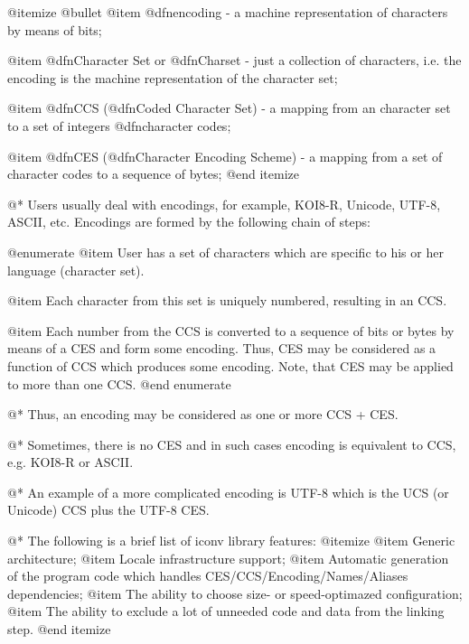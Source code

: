 @itemize @bullet
@item
@dfn{encoding} - a machine representation of characters by means of bits;

@item
@dfn{Character Set} or @dfn{Charset} - just a collection of
characters, i.e. the encoding is the machine representation of the character set; 

@item
@dfn{CCS} (@dfn{Coded Character Set}) - a mapping from an character set to a
set of integers @dfn{character codes};

@item
@dfn{CES} (@dfn{Character Encoding Scheme}) - a mapping from a set of character
codes to a sequence of bytes;
@end itemize

@*
Users usually deal with encodings, for example, KOI8-R, Unicode, UTF-8,
ASCII, etc. Encodings are formed by the following chain of steps:

@enumerate
@item
User has a set of characters which are specific to his or her language (character set).

@item
Each character from this set is uniquely numbered, resulting in an CCS.

@item
Each number from the CCS is converted to a sequence of bits or bytes by means
of a CES and form some encoding. Thus, CES may be considered as a
function of CCS which produces some encoding. Note, that CES may be
applied to more than one CCS.
@end enumerate

@*
Thus, an encoding may be considered as one or more CCS + CES.

@*
Sometimes, there is no CES and in such cases encoding is equivalent
to CCS, e.g. KOI8-R or ASCII.

@*
An example of a more complicated encoding is UTF-8 which is the UCS
(or Unicode) CCS plus the UTF-8 CES.

@*
The following is a brief list of iconv library features:
@itemize
@item
Generic architecture;
@item
Locale infrastructure support;
@item
Automatic generation of the program code which handles
CES/CCS/Encoding/Names/Aliases dependencies;
@item
The ability to choose size- or speed-optimazed
configuration;
@item
The ability to exclude a lot of unneeded code and data from the linking step.
@end itemize




